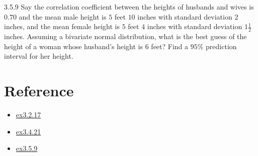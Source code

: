 \begin{exercise}{3.5.9}{}
    Say the correlation coefficient between the heights of husbands and wives is 
    $0.70$ and the mean male height is $5$ feet $10$ inches with standard deviation $2$ inches,
    and the mean female height is $5$ feet $4$ inches with standard deviation $1\frac{1}{2}$ inches.
    Assuming a bivariate normal distribution, what is the best guess of the height of 
    a woman whose husband's height is $6$ feet? Find a $95\%$ prediction interval for her height.
\end{exercise}

\section{Reference}

\begin{itemize}
    \item \href{https://tomoki-okuno.com/files/math/Ch3_sol.pdf}{ex3.2.17}
    \item \href{https://cs.du.edu/~paulhorn/361/assn11-solns.pdf}{ex3.4.21}
    \item \href{https://faculty.etsu.edu/gardnerr/4047/Beamer-Hogg-McKean-Craig/Proofs-HMC-3-5.pdf}{ex3.5.9}
\end{itemize}



